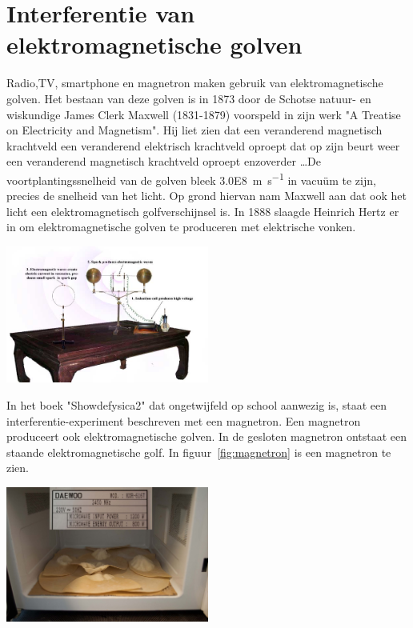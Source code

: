 \documentclass[../main.tex]{subfiles}
\begin{document}
\section{Interferentie van elektromagnetische golven}
Radio,TV, smartphone en magnetron maken gebruik van elektromagnetische golven.
Het bestaan van deze golven is in 1873 door de Schotse natuur- en wiskundige James Clerk Maxwell (1831-1879) voorspeld in zijn werk "A Treatise on Electricity and Magnetism". Hij liet zien dat een veranderend magnetisch krachtveld een veranderend elektrisch krachtveld oproept dat op zijn beurt weer een veranderend magnetisch krachtveld oproept enzoverder \ldots De voortplantingssnelheid van de golven bleek \SI{3.0E8}{\meter\per\second} in vacu\"um te zijn, precies de snelheid van het licht. Op grond hiervan nam Maxwell aan dat ook het licht een elektromagnetisch golfverschijnsel is. In 1888 slaagde Heinrich Hertz er in om elektromagnetische golven te produceren met elektrische vonken. 

\begin{center}
\leavevmode
\includegraphics[width=0.5\textwidth]{./img/hertztafel.png}
\end{center}

In het boek "Showdefysica2" dat ongetwijfeld op school aanwezig is, staat een interferentie-experiment beschreven met een magnetron. Een magnetron produceert ook elektromagnetische golven. In de gesloten magnetron ontstaat een staande elektromagnetische golf. In figuur~\ref{fig:magnetron} is een magnetron te zien.

\begin{center}
\leavevmode
\includegraphics[width=0.5\textwidth]{./img/magnetron.png}
\end{center}
\end{document}
